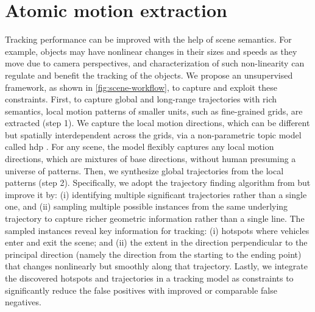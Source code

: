 \section{Atomic motion extraction}
\label{sec:scene-hdp}

Tracking performance can be improved with the help of scene semantics.
For example, objects may have nonlinear changes in their sizes and speeds as they move due to camera perspectives,
and characterization of such non-linearity can regulate and benefit the tracking of the objects.
We propose an unsupervised framework, as shown in \ref{fig:scene-workflow}, to capture and exploit these constraints.
First, to capture global and long-range trajectories
with rich semantics,
local motion patterns of smaller units, such as fine-grained grids, are extracted (step 1).
We capture the local motion directions, which can be different but spatially interdependent across the grids, via a non-parametric topic model called \gls{hdp} \cite{yee2006hierarchical,wang2009unsupervised}.
For any scene, the model flexibly captures any local motion directions,
which are mixtures of base directions, without human presuming a universe of patterns.
Then, we synthesize global trajectories from the local patterns (step 2).
Specifically,
we adopt the trajectory finding algorithm from \cite{wang2009unsupervised} but improve it by:
(i) identifying multiple significant trajectories rather than a single one, and
(ii) sampling multiple possible instances from the same underlying trajectory to capture richer geometric information rather than a single line.
The sampled instances reveal key information for tracking:
(i) hotspots where vehicles enter and exit the scene; and
(ii) the extent in the direction perpendicular to the principal direction
(namely the direction from the starting to the ending point)
that changes nonlinearly but smoothly along that trajectory.
Lastly, we integrate the discovered hotspots and trajectories
in a tracking model as constraints to significantly reduce the false positives with improved or comparable false negatives.

